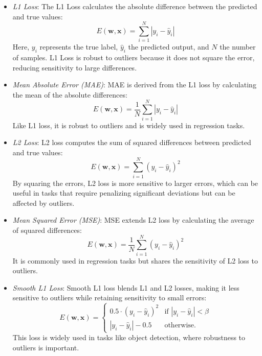 \begin{itemize}
    \item \textit{L1 Loss}:  
    The L1 Loss calculates the absolute difference between the predicted and true values:
    \begin{equation}
        E(\mathbf{w}, \mathbf{x}) = \sum_{i=1}^{N} |y_i - \hat{y}_i|
    \end{equation}
    Here, \(y_i\) represents the true label, \(\hat{y}_i\) the predicted output, and \(N\) the number of samples. L1 Loss is robust to outliers because it does not square the error, reducing sensitivity to large differences.

    \item \textit{Mean Absolute Error (MAE)}:  
    MAE is derived from the L1 loss by calculating the mean of the absolute differences:
    \begin{equation}
        E(\mathbf{w}, \mathbf{x}) = \frac{1}{N} \sum_{i=1}^{N} |y_i - \hat{y}_i|
    \end{equation}
    Like L1 loss, it is robust to outliers and is widely used in regression tasks.

    \item \textit{L2 Loss}:  
    L2 loss computes the sum of squared differences between predicted and true values:
    \begin{equation}
        E(\mathbf{w}, \mathbf{x}) = \sum_{i=1}^{N} (y_i - \hat{y}_i)^2
    \end{equation}
    By squaring the errors, L2 loss is more sensitive to larger errors, which can be useful in tasks that require penalizing significant deviations but can be affected by outliers.

    \item \textit{Mean Squared Error (MSE)}:  
    MSE extends L2 loss by calculating the average of squared differences:
    \begin{equation}
        E(\mathbf{w}, \mathbf{x}) = \frac{1}{N} \sum_{i=1}^{N} (y_i - \hat{y}_i)^2
    \end{equation}
    It is commonly used in regression tasks but shares the sensitivity of L2 loss to outliers.

    \item \textit{Smooth L1 Loss}:  
    Smooth L1 loss blends L1 and L2 losses, making it less sensitive to outliers while retaining sensitivity to small errors:
    \begin{equation}
        E(\mathbf{w}, \mathbf{x}) = 
        \begin{cases} 
            0.5 \cdot (y_i - \hat{y}_i)^2 & \text{if } |y_i - \hat{y}_i| < \beta \\
          |y_i - \hat{y}_i| - 0.5 & \text{otherwise.}
        \end{cases}
    \end{equation}
    This loss is widely used in tasks like object detection, where robustness to outliers is important.


\end{itemize}
